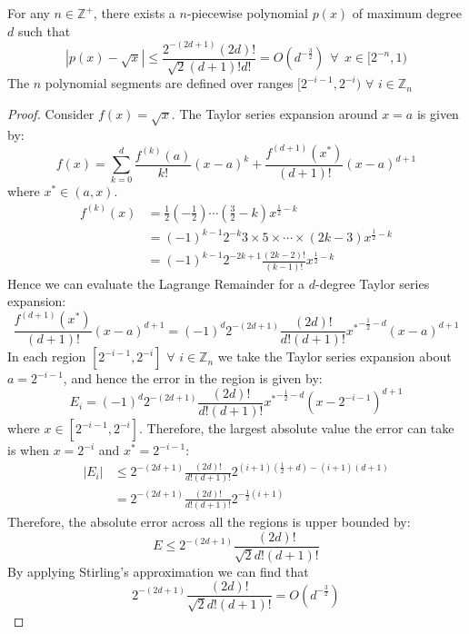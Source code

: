 \begin{lemma}
\label{lemma:sqrtpoly}
For any $n \in \mathbb{Z}^+$, there exists a $n$-piecewise polynomial $p(x)$ of maximum degree $d$ such that 
$$|p(x) - \sqrt{x}| \leq \frac{2^{-(2d+1)}(2d)!}{\sqrt{2}(d+1)!d!} = O(d^{-\frac{3}{2}}) \>\>\forall\>\> x\in [2^{-n}, 1)$$
The $n$ polynomial segments are defined over ranges $[2^{-i-1}, 2^{-i})$ $\forall$ $i \in \mathbb{Z}_n$
\end{lemma}
\begin{proof}
Consider $f(x) = \sqrt{x}$. The Taylor series expansion around $x=a$ is given by:
\begin{equation}
    f(x) = \sum_{k=0}^d \frac{f^{(k)}(a)}{k!}(x-a)^k + \frac{f^{(d+1)}(x^*)}{(d+1)!}(x-a)^{d+1}
\end{equation}
where $x^* \in (a,x)$.
\begin{align}
    f^{(k)}(x) &= \frac{1}{2}(-\frac{1}{2})\cdots (\frac{3}{2}-k)x^{\frac{1}{2}-k} \\
    &= (-1)^{k-1} 2^{-k} 3 \times 5 \times \cdots \times (2k-3) x^{\frac{1}{2}-k} \\
    &= (-1)^{k-1} 2^{-2k+1} \frac{(2k-2)!}{(k-1)!}x^{\frac{1}{2}-k}
\end{align}
Hence we can evaluate the Lagrange Remainder for a $d$-degree Taylor series expansion:
\begin{equation}
    \frac{f^{(d+1)}(x^*)}{(d+1)!}(x-a)^{d+1} = (-1)^{d} 2^{-(2d+1)} \frac{(2d)!}{d!(d+1)!}{x^*}^{-\frac{1}{2}-d}(x-a)^{d+1}
\end{equation}
In each region $[2^{-i-1}, 2^{-i}]$ $\forall$ $i \in \mathbb{Z}_n$ we take the Taylor series expansion about $a=2^{-i-1}$, and hence the error in the region is given by:
\begin{equation}
    E_i = (-1)^{d} 2^{-(2d+1)} \frac{(2d)!}{d!(d+1)!}{x^*}^{-\frac{1}{2}-d}(x-2^{-i-1})^{d+1}
\end{equation}
where $x \in [2^{-i-1}, 2^{-i}]$. Therefore, the largest absolute value the error can take is when $x = 2^{-i}$ and $x^* = 2^{-i-1}$:
\begin{align}
        |E_i| &\leq  2^{-(2d+1)} \frac{(2d)!}{d!(d+1)!}2^{(i+1)(\frac{1}{2}+d)-(i+1)(d+1)}\\
        &=  2^{-(2d+1)} \frac{(2d)!}{d!(d+1)!}2^{-\frac{1}{2}(i+1)}
\end{align}
Therefore, the absolute error across all the regions is upper bounded by:
\begin{equation}
    E \leq 2^{-(2d+1)} \frac{(2d)!}{\sqrt{2}d!(d+1)!}
\end{equation}
By applying Stirling's approximation we can find that
\begin{equation}
    2^{-(2d+1)} \frac{(2d)!}{\sqrt{2}d!(d+1)!} = O(d^{-\frac{3}{2}})
\end{equation}
\end{proof}
